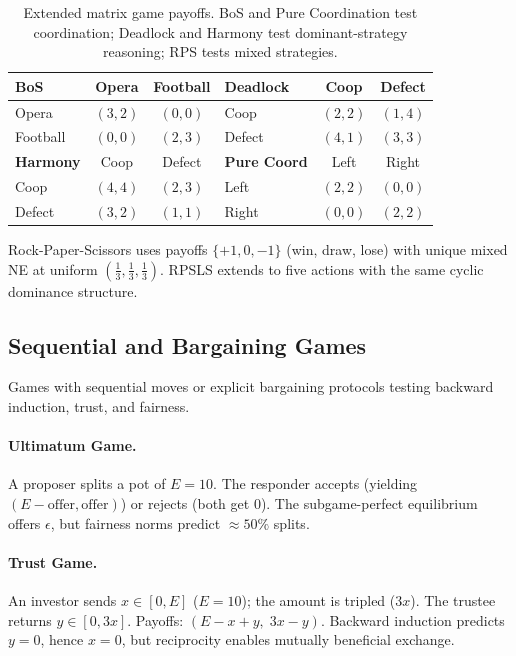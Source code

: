 \begin{table}[h]
\centering\small
\caption{Extended matrix game payoffs. BoS and Pure Coordination test coordination;
Deadlock and Harmony test dominant-strategy reasoning; RPS tests mixed strategies.}
\label{tab:extended}
\begin{tabular}{@{}lcc|lcc@{}}
\toprule
\textbf{BoS} & Opera & Football & \textbf{Deadlock} & Coop & Defect \\
\midrule
Opera & $(3,2)$ & $(0,0)$ & Coop & $(2,2)$ & $(1,4)$ \\
Football & $(0,0)$ & $(2,3)$ & Defect & $(4,1)$ & $(3,3)$ \\
\midrule
\textbf{Harmony} & Coop & Defect & \textbf{Pure Coord} & Left & Right \\
\midrule
Coop & $(4,4)$ & $(2,3)$ & Left & $(2,2)$ & $(0,0)$ \\
Defect & $(3,2)$ & $(1,1)$ & Right & $(0,0)$ & $(2,2)$ \\
\bottomrule
\end{tabular}
\end{table}

\noindent Rock-Paper-Scissors uses payoffs $\{+1, 0, -1\}$ (win, draw, lose) with
unique mixed NE at uniform $(\tfrac{1}{3}, \tfrac{1}{3}, \tfrac{1}{3})$.
RPSLS extends to five actions with the same cyclic dominance structure.

\subsection{Sequential and Bargaining Games}
\label{sec:sequential-bargaining}

Games with sequential moves or explicit bargaining protocols testing backward
induction, trust, and fairness.

\paragraph{Ultimatum Game.} A proposer splits a pot of $E=10$. The responder
accepts (yielding $(E - \text{offer}, \text{offer})$) or rejects (both get $0$).
The subgame-perfect equilibrium offers $\epsilon$, but fairness norms predict
$\approx 50\%$ splits.

\paragraph{Trust Game.} An investor sends $x \in [0, E]$ ($E=10$); the amount
is tripled ($3x$). The trustee returns $y \in [0, 3x]$. Payoffs:
$(E - x + y,\; 3x - y)$. Backward induction predicts $y=0$, hence $x=0$,
but reciprocity enables mutually beneficial exchange.

